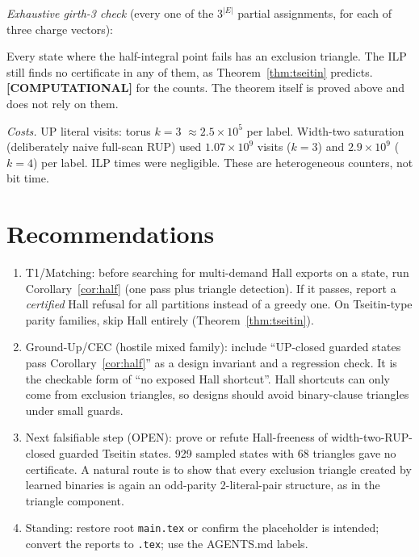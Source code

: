 \documentclass[11pt]{article}
\theoremstyle{definition}
\theoremstyle{remark}
\newcommand{\lab}[1]{\textbf{[#1]}}
\begin{document}
\emph{Exhaustive girth-3 check} (every one of the $3^{|E|}$ partial assignments, for each of
three charge vectors):
\begin{center}\small
{}
\end{center}
Every state where the half-integral point fails has an exclusion triangle. The ILP still finds no
certificate in any of them, as Theorem~\ref{thm:tseitin} predicts. \lab{COMPUTATIONAL} for the
counts. The theorem itself is proved above and does not rely on them.

\emph{Costs.} UP literal visits: torus $k{=}3$ $\approx2.5\times10^5$ per label. Width-two
saturation (deliberately naive full-scan RUP) used $1.07\times10^9$ visits ($k{=}3$) and
$2.9\times10^9$ ($k{=}4$) per label. ILP times were negligible. These are heterogeneous
counters, not bit time.

\section{Recommendations}
\begin{enumerate}
\item T1/Matching: before searching for multi-demand Hall exports on a state, run
Corollary~\ref{cor:half} (one pass plus triangle detection). If it passes, report a
\emph{certified} Hall refusal for all partitions instead of a greedy one. On Tseitin-type parity
families, skip Hall entirely (Theorem~\ref{thm:tseitin}).
\item Ground-Up/CEC (hostile mixed family): include ``UP-closed guarded states pass
Corollary~\ref{cor:half}'' as a design invariant and a regression check. It is the checkable
form of ``no exposed Hall shortcut''. Hall shortcuts can only come from exclusion triangles, so
designs should avoid binary-clause triangles under small guards.
\item Next falsifiable step (OPEN): prove or refute Hall-freeness of width-two-RUP-closed guarded
Tseitin states. 929 sampled states with 68 triangles gave no certificate. A natural route is to
show that every exclusion triangle created by learned binaries is again an odd-parity
2-literal-pair structure, as in the triangle component.
\item Standing: restore root \texttt{main.tex} or confirm the placeholder is intended; convert
the reports to \texttt{.tex}; use the AGENTS.md labels.
\end{enumerate}
\end{document}
